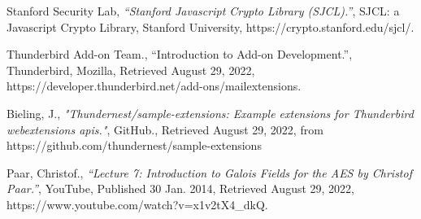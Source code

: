 \begin{thebibliography}{11}
  Stanford Security Lab,
  \emph {“Stanford Javascript Crypto Library (SJCL).”},
   SJCL: a Javascript Crypto Library, 
   Stanford University,
   https://crypto.stanford.edu/sjcl/.
   
  Thunderbird Add-on Team.,
  “Introduction to Add-on Development.”,
  Thunderbird, Mozilla, 
  Retrieved August 29, 2022,
  https://developer.thunderbird.net/add-ons/mailextensions.
  
  Bieling, J.,
  \emph{"Thundernest/sample-extensions: Example extensions for Thunderbird webextensions apis."},
  GitHub.,
  Retrieved August 29, 2022, 
  from https://github.com/thundernest/sample-extensions 
  
  Paar, Christof.,
  \emph{“Lecture 7: Introduction to Galois Fields for the AES by Christof Paar.”},
  YouTube,
  Published 30 Jan. 2014, 
  Retrieved August 29, 2022,
  https://www.youtube.com/watch?v=x1v2tX4\_dkQ.

   

\end{thebibliography}
